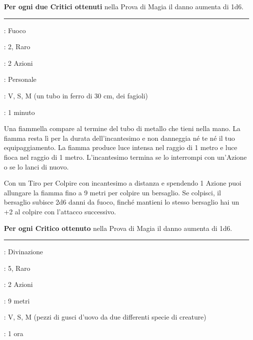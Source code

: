\begin{multicols}{2}
\textbf{Per ogni due Critici ottenuti} nella Prova di Magia il danno aumenta di 1d6.

\smallskip\noindent\rule{\linewidth}{2pt} \hypertarget{Lanciafiamme}{}\smallskip{}
\noindent
\begin{description}[noitemsep, topsep=0pt, parsep=0pt, partopsep=0pt, leftmargin=0cm, labelwidth=2.8cm]
	\item[\textbf{Lista di Magia}]: Fuoco
	\item[\textbf{Livello}]: 2, Raro
	\item[\textbf{T. di Lancio}]: 2 Azioni
	\item[\textbf{Gittata}]: Personale
	\item[\textbf{Componenti}]: V, S, M (un tubo in ferro di 30 cm, dei fagioli)
	\item[\textbf{Durata}]: 1 minuto
\end{description}

Una fiammella compare al termine del tubo di metallo che tieni nella mano. La fiamma resta lì per la durata dell'incantesimo e non danneggia né te né il tuo equipaggiamento. La fiamma produce luce intensa nel raggio di 1 metro e luce fioca nel raggio di 1 metro. L'incantesimo termina se lo interrompi con un'Azione o se lo lanci di nuovo.

Con un Tiro per Colpire con incantesimo a distanza e spendendo 1 Azione puoi allungare la fiamma fino a 9 metri per colpire un bersaglio. Se colpisci, il bersaglio subisce 2d6 danni da fuoco, finché mantieni lo stesso bersaglio hai un +2 al colpire con l'attacco successivo.

\textbf{Per ogni Critico ottenuto} nella Prova di Magia il danno aumenta di 1d6.

\smallskip\noindent\rule{\linewidth}{2pt} \hypertarget{Legame Telepatico}{}\smallskip{}
\noindent
\begin{description}[noitemsep, topsep=0pt, parsep=0pt, partopsep=0pt, leftmargin=0cm, labelwidth=2.8cm]
	\item[\textbf{Lista di Magia}]: Divinazione
	\item[\textbf{Livello}]: 5, Raro
	\item[\textbf{T. di Lancio}]: 2 Azioni
	\item[\textbf{Gittata}]: 9 metri
	\item[\textbf{Componenti}]: V, S, M (pezzi di gusci d'uovo da due differenti specie di creature)
	\item[\textbf{Durata}]: 1 ora
\end{description}


\end{multicols}
